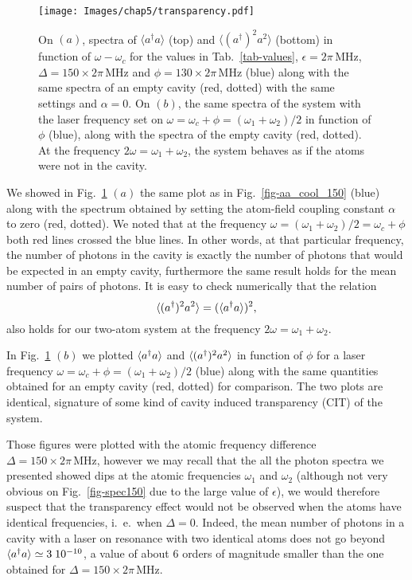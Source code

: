 \begin{figure}
    \center
    \texttt{[image: Images/chap5/transparency.pdf]}
    \caption[ $\langle a^\dagger a \rangle$ and $\langle (a^\dagger)^2 a^2 \rangle$ in function of $\omega-\omega_c$ ]{On $(a)$, spectra of $\langle a^\dagger a \rangle$ (top) and $\langle (a^\dagger)^2 a^2 \rangle$ (bottom) in function of $\omega-\omega_c$ for the values in Tab.~\ref{tab-values}, $\epsilon= 2\pi\,\mbox{MHz}$, $\Delta=150\times 2\pi\,\mbox{MHz}$ and $\phi=130\times 2\pi\,\mbox{MHz}$ (blue) along with the same spectra of an empty cavity (red, dotted) with the same settings and $\alpha=0$. On $(b)$, the same spectra of the system with the laser frequency set on $\omega = \omega_c + \phi = (\omega_1+\omega_2)/2$  in function of $\phi$ (blue), along with the spectra of the empty cavity (red, dotted). At the frequency $2\omega= \omega_1+\omega_2$, the system behaves as if the atoms were not in the cavity. }
    \label{fig-transparency}
\end{figure}

We showed in Fig.~\ref{fig-transparency} $(a)$ the same plot as in Fig.~\ref{fig-aa_cool_150} (blue) along with the spectrum obtained by setting the atom-field coupling constant $\alpha$ to zero (red, dotted). We noted that at the frequency $\omega= (\omega_1+\omega_2)/2=\omega_c+\phi$ both red lines crossed the blue lines. In other words, at that particular frequency, the number of photons in the cavity is exactly the number of photons that would be expected in an empty cavity, furthermore the same result holds for the mean number of pairs of photons. It is easy to check numerically that the relation
\[\langle (a^\dagger)^2 a^2 \rangle=(\langle a^\dagger a \rangle)^2,\]
also holds for our two-atom system at the frequency $2\omega= \omega_1+\omega_2$.

In Fig.~\ref{fig-transparency} $(b)$ we plotted $\langle a^\dagger a \rangle$ and $\langle (a^\dagger)^2 a^2 \rangle$ in function of $\phi$ for a laser frequency $\omega = \omega_c + \phi = (\omega_1+\omega_2)/2$ (blue) along with the same quantities obtained for an empty cavity (red, dotted) for comparison. The two plots are identical, signature of some kind of cavity induced transparency (CIT) of the system.

Those figures were plotted with the atomic frequency difference $\Delta=150\times 2\pi\,\mbox{MHz}$, however we may recall that the all the photon spectra we presented showed dips at the atomic frequencies $\omega_1$ and $\omega_2$ (although not very obvious on Fig.~\ref{fig-spec150} due to the large value of $\epsilon$), we would therefore suspect that the transparency effect would not be observed  when the atoms have identical frequencies, i.~e.~when $\Delta=0$. Indeed, the mean number of photons in a cavity with a laser on resonance with two identical atoms does not go beyond $\langle a^\dagger a \rangle \simeq 3 \; 10^{-10}$, a value of about 6 orders of magnitude smaller than the one obtained for $\Delta=150\times 2\pi\,\mbox{MHz}$.

